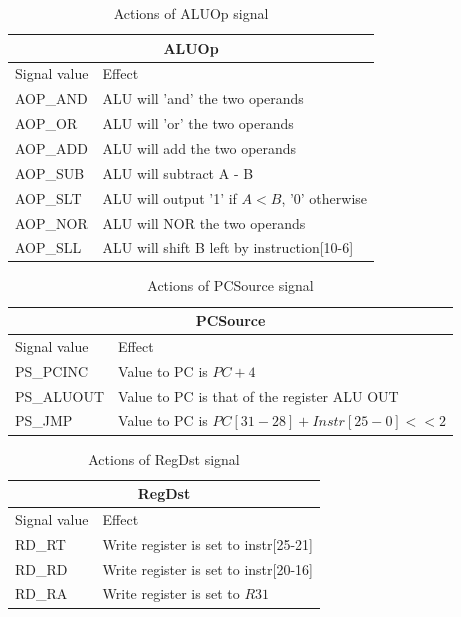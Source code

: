\documentclass[12pt, a4paper]{article}
\begin{document}
\begin{table}[h]
  \centering
  \begin{tabular}{l | l} \hline
    \multicolumn{2}{c}{ALUOp} \\ \hline
    Signal value & Effect \\ \hline
    AOP\_AND & ALU will 'and' the two operands \\
    AOP\_OR  & ALU will 'or' the two operands \\
    AOP\_ADD & ALU will add the two operands \\
    AOP\_SUB & ALU will subtract A - B \\
    AOP\_SLT & ALU will output '1' if $A<B$, '0' otherwise \\
    AOP\_NOR & ALU will NOR the two operands \\
    AOP\_SLL & ALU will shift B left by instruction[10-6] \\
    \hline
  \end{tabular}
  \caption{Actions of ALUOp signal}
  \label{tbl:aluop}
\end{table}

\begin{table}[h]
  \centering
  \begin{tabular}{l | l} \hline
    \multicolumn{2}{c}{PCSource} \\ \hline
    Signal value & Effect \\ \hline
    PS\_PCINC    & Value to PC is $PC+4$ \\
    PS\_ALUOUT   & Value to PC is that of the register ALU OUT \\
    PS\_JMP      & Value to PC is $PC[31-28] + Instr[25-0] << 2$ \\
    \hline
  \end{tabular}
  \caption{Actions of PCSource signal}
  \label{tbl:pcSrc}
\end{table}

\begin{table}[h]
  \centering
  \begin{tabular}{l | l} \hline
    \multicolumn{2}{c}{RegDst} \\ \hline
    Signal value & Effect \\ \hline
    RD\_RT       & Write register is set to instr[25-21] \\
    RD\_RD       & Write register is set to instr[20-16] \\
    RD\_RA       & Write register is set to $R31$ \\
    \hline
  \end{tabular}
  \caption{Actions of RegDst signal}
  \label{tbl:regDst}
\end{table}
\end{document}
